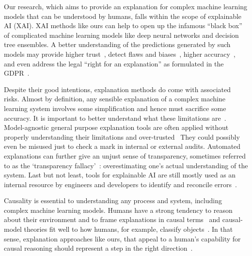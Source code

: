\documentclass{article}
\begin{document}


Our research, which aims to provide an explanation for complex machine learning models that can be understood by humans, falls within the scope of explainable AI (XAI). XAI methods like ours can help to open up the infamous ``black box'' of complicated machine learning models like deep neural networks and decision tree ensembles. A better understanding of the predictions generated by such models may provide higher trust~\cite{ribeiro2016should}, detect flaws and biases~\cite{kusner2017counterfactual}, higher accuracy~\cite{bhatt2020explainable}, and even address the legal ``right for an explanation'' as formulated in the GDPR~\cite{gdpr2017}.

Despite their good intentions, explanation methods do come with associated risks. Almost by definition, any sensible explanation of a complex machine learning system involves some simplification and hence must sacrifice some accuracy. It is important to better understand what these limitations are~\cite{kumar2020problems}. Model-agnostic general purpose explanation tools are often applied without properly understanding their limitations and over-trusted~\cite{kaur2020interpreting} They could possibly even be misused just to check a mark in internal or external audits. Automated explanations can further give an unjust sense of transparency, sometimes referred to as the `transparency fallacy'~\cite{edwards2017slave}: overestimating one's actual understanding of the system. Last but not least, tools for explainable AI are still mostly used as an internal resource by engineers and developers to identify and reconcile errors~\cite{bhatt2020explainable}.

Causality is essential to understanding any process and system, including complex machine learning models. Humans have a strong tendency to reason about their environment and to frame explanations in causal terms~\cite{sloman2005causal,lombrozo2017causal} and causal-model theories fit well to how humans, for example, classify objects~\cite{rehder2003causal}. In that sense, explanation approaches like ours, that appeal to a human's capability for causal reasoning should represent a step in the right direction~\cite{mittelstadt2019explaining}.




\end{document}
